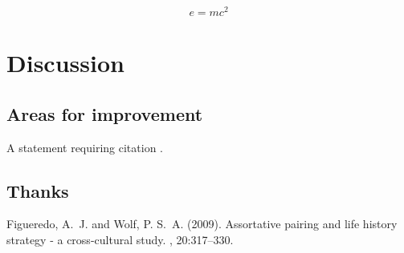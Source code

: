 \documentclass[twoside,twocolumn]{article}
\begin{document}
\blindtext %

\begin{equation}
\label{eq:emc}
e = mc^2
\end{equation}

\blindtext %


\section{Discussion}

\subsection{Areas for improvement}

A statement requiring citation \cite{Figueredo:2009dg}.
\blindtext %

\subsection{Thanks}

\blindtext %


\begin{thebibliography}{99} %

Figueredo, A.~J. and Wolf, P. S.~A. (2009).
\newblock Assortative pairing and life history strategy - a cross-cultural
  study.
, 20:317--330.
 
\end{thebibliography}

\end{document}
